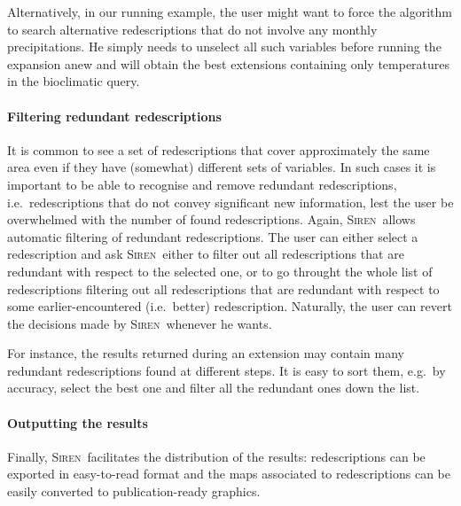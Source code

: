 \documentclass{sig-alternate}
\newcommand{\prg}[1]{\paragraph{#1}}
\newcommand{\Siren}{\textsc{Siren}}
\begin{document}
Alternatively, in our running example, the user might want to force
the algorithm to search alternative redescriptions that do not involve
any monthly precipitations. He simply needs to unselect all such
variables before running the expansion anew and will obtain the best
extensions containing only temperatures in the bioclimatic query.




\prg{Filtering redundant redescriptions}
\label{sec:filt-redund-redescr}
It is common to see a set of redescriptions that cover approximately
the same area even if they have (somewhat) different sets of
variables. In such cases it is important to be able to recognise and
remove redundant redescriptions, i.e.\ redescriptions that do not
convey significant new information, lest the user be overwhelmed with
the number of found redescriptions. Again, \Siren\ allows automatic
filtering of redundant redescriptions. The user can either select a
redescription and ask \Siren\ either to filter out all redescriptions
that are redundant with respect to the selected one, or to go throught
the whole list of redescriptions filtering out all redescriptions that
are redundant with respect to some earlier-encountered (i.e.\ better)
redescription. Naturally, the user can revert the decisions made by
\Siren\ whenever he wants.

For instance, the results returned during an extension may contain
many redundant redescriptions found at different steps. It is easy to
sort them, e.g.\ by accuracy, select the best one and filter all the
redundant ones down the list.


\prg{Outputting the results}
\label{sec:outputting-results}
Finally, \Siren\ facilitates the distribution of the results:
redescriptions can be exported in easy-to-read format and the
maps associated to redescriptions can be easily converted to
publication-ready graphics. 
\end{document}
